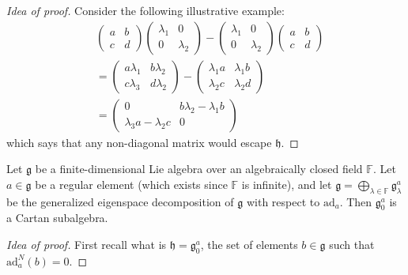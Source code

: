\begin{proof}[Idea of proof]
Consider the following illustrative example:
\begin{align*}
&\begin{pmatrix}
a&b\\
c&d
\end{pmatrix}\begin{pmatrix}
\lambda_1&0\\
0&\lambda_2
\end{pmatrix}-\begin{pmatrix}
\lambda_1&0\\
0&\lambda_2
\end{pmatrix}\begin{pmatrix}
a&b\\
c&d
\end{pmatrix}\\
&=\begin{pmatrix}
a \lambda_1&b \lambda_2\\
c \lambda_3&d \lambda_2
\end{pmatrix}-
\begin{pmatrix}
\lambda_1a&\lambda_1b\\
\lambda_2c&\lambda_2d
\end{pmatrix}\\
&=\begin{pmatrix}
0&b\lambda_2-\lambda_1b\\
\lambda_3a-\lambda_2c&0
\end{pmatrix}\qquad
\end{align*}
which says that any non-diagonal matrix would
escape $\mathfrak{h}$.
\end{proof}

\begin{theorem}[Cartan]
\label{theorem-finit-dimen-lie-algeb-over}
Let $\mathfrak{g}$ be a finite-dimensional
Lie algebra over an
algebraically closed field $\mathbb{F}$. Let
$a \in \mathfrak{g}$
be a regular element (which exists since
$\mathbb{F}$ is infinite),
and let $\mathfrak{g}=\bigoplus_{\lambda \in
\mathbb{F}}\mathfrak{g}^a_\lambda$
be the generalized eigenspace decomposition
of $\mathfrak{g}$
with respect to $\text{ad}_a$. Then
$\mathfrak{g}_0^a$
is a Cartan subalgebra.
\end{theorem}

\begin{proof}[Idea of proof]
First recall what is
$\mathfrak{h}=\mathfrak{g}_0^a$, the set of
elements
$b\in\mathfrak{g}$ such that
$\text{ad}_a^N(b)=0$.
\end{proof}

